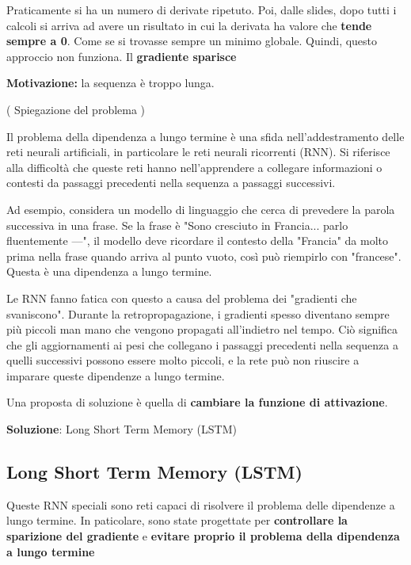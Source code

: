 Praticamente si ha un numero di derivate ripetuto. Poi, dalle slides, dopo
tutti i calcoli si arriva ad avere un risultato in cui la derivata ha valore
che \textbf{tende sempre a 0}. Come se si trovasse sempre un minimo globale.
Quindi, questo approccio non funziona. Il \textbf{gradiente sparisce}

\textbf{Motivazione:} la sequenza è troppo lunga.
\begin{definition}(
    Spiegazione del problema )

    Il problema della dipendenza a lungo termine è una sfida nell'addestramento
    delle reti neurali artificiali, in particolare le reti neurali ricorrenti
    (RNN). Si riferisce alla difficoltà che queste reti hanno nell'apprendere a
    collegare informazioni o contesti da passaggi precedenti nella sequenza a
    passaggi successivi.

    Ad esempio, considera un modello di linguaggio che cerca di prevedere la parola
    successiva in una frase. Se la frase è "Sono cresciuto in Francia... parlo
    fluentemente ---", il modello deve ricordare il contesto della "Francia" da
    molto prima nella frase quando arriva al punto vuoto, così può riempirlo con
    "francese". Questa è una dipendenza a lungo termine.

    Le RNN fanno fatica con questo a causa del problema dei "gradienti che
    svaniscono". Durante la retropropagazione, i gradienti spesso diventano sempre
    più piccoli man mano che vengono propagati all'indietro nel tempo. Ciò
    significa che gli aggiornamenti ai pesi che collegano i passaggi precedenti
    nella sequenza a quelli successivi possono essere molto piccoli, e la rete può
    non riuscire a imparare queste dipendenze a lungo termine.
\end{definition}

Una proposta di soluzione è quella di \textbf{cambiare la funzione di
    attivazione}.

\textbf{Soluzione}: Long Short Term Memory (LSTM)

\subsection{Long Short Term Memory (LSTM)}

Queste RNN speciali sono reti capaci di risolvere il problema delle dipendenze a lungo termine. In paticolare, 
sono state progettate per \textbf{controllare la sparizione del gradiente} e \textbf{evitare proprio il problema della dipendenza a lungo termine}

